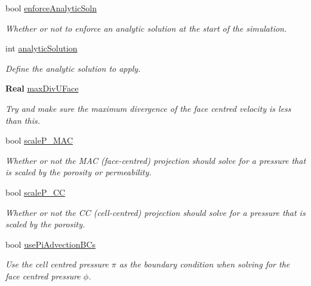 \begin{DoxyCompactItemize}
bool \hyperlink{struct_mushy_layer_options_a40bf0333dc4481f5a449785c58f16b76}{enforce\+Analytic\+Soln}
\begin{DoxyCompactList}\small\item\em Whether or not to enforce an analytic solution at the start of the simulation. \end{DoxyCompactList}\item 
int \hyperlink{struct_mushy_layer_options_abf28d877dea7de52109802ad51f75fa2}{analytic\+Solution}
\begin{DoxyCompactList}\small\item\em Define the analytic solution to apply. \end{DoxyCompactList}\item 
\mbox{\label{struct_mushy_layer_options_a40711d22ddae5f380a682e513a2aa62f}} 
\textbf{ Real} \hyperlink{struct_mushy_layer_options_a40711d22ddae5f380a682e513a2aa62f}{max\+Div\+U\+Face}
\begin{DoxyCompactList}\small\item\em Try and make sure the maximum divergence of the face centred velocity is less than this. \end{DoxyCompactList}\item 
bool \hyperlink{struct_mushy_layer_options_acabfc7dcbcac5cb973e9478101e3768d}{scale\+P\+\_\+\+M\+AC}
\begin{DoxyCompactList}\small\item\em Whether or not the M\+AC (face-\/centred) projection should solve for a pressure that is scaled by the porosity or permeability. \end{DoxyCompactList}\item 
bool \hyperlink{struct_mushy_layer_options_a862aeef81ad6231eed93035f9640e917}{scale\+P\+\_\+\+CC}
\begin{DoxyCompactList}\small\item\em Whether or not the CC (cell-\/centred) projection should solve for a pressure that is scaled by the porosity. \end{DoxyCompactList}\item 
bool \hyperlink{struct_mushy_layer_options_a2ac51724bee29034037c2c26f320ee11}{use\+Pi\+Advection\+B\+Cs}
\begin{DoxyCompactList}\small\item\em Use the cell centred pressure $ \pi $ as the boundary condition when solving for the face centred pressure $ \phi $. \end{DoxyCompactList}\item 

\end{DoxyCompactItemize}
